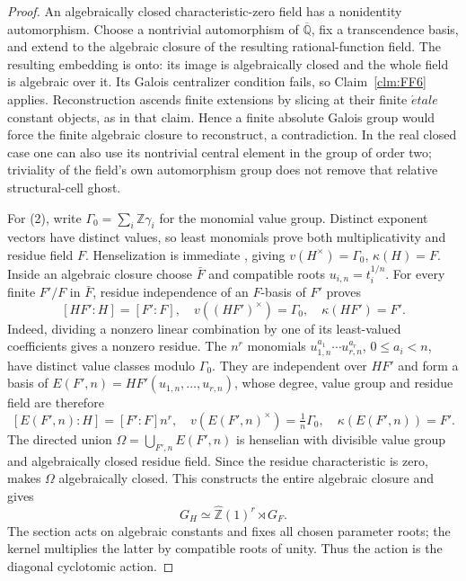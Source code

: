 \begin{proof}
An algebraically closed characteristic-zero field has a
nonidentity automorphism. Choose a nontrivial automorphism
of \(\overline{\mathbb Q}\), fix a transcendence basis,
and extend to the algebraic closure of the resulting
rational-function field. The resulting embedding is onto:
its image is algebraically closed and the whole field is
algebraic over it. Its Galois centralizer condition fails,
so Claim~\ref{clm:FF6} applies. Reconstruction ascends
finite extensions by slicing at their finite \(\acute etale\)
constant objects, as in that claim. Hence a finite absolute
Galois group would force the finite algebraic closure to
reconstruct, a contradiction. In the real closed case one
can also use its nontrivial central element in the group
of order two; triviality of the field's own automorphism
group does not remove that relative structural-cell ghost.

For (2), write \(\Gamma_0=\sum_i\mathbb Z\gamma_i\)
for the monomial value group. Distinct exponent vectors
have distinct values, so least monomials prove both
multiplicativity and residue field \(F\). Henselization
is immediate \citep[Corollary~3.3.26]{FF_ADH2017}, giving
\(v(H^\times)=\Gamma_0\), \(\kappa(H)=F\).
Inside an algebraic closure choose \(\bar F\) and
compatible roots \(u_{i,n}=t_i^{1/n}\). For every finite
\(F'/F\) in \(\bar F\), residue independence of an
\(F\)-basis of \(F'\) proves
\[
 [HF':H]=[F':F],\quad
 v((HF')^\times)=\Gamma_0,\quad \kappa(HF')=F'.
\]
Indeed, dividing a nonzero linear combination by one of
its least-valued coefficients gives a nonzero residue.
The \(n^r\) monomials
\(u_{1,n}^{a_1}\cdots u_{r,n}^{a_r}\),
\(0\le a_i<n\), have distinct value classes modulo
\(\Gamma_0\). They are independent over \(HF'\) and
form a basis of
\(E(F',n)=HF'(u_{1,n},\ldots,u_{r,n})\), whose degree,
value group and residue field are therefore
\[
 [E(F',n):H]=[F':F]n^r,\quad
 v(E(F',n)^\times)=\tfrac1n\Gamma_0,\quad
 \kappa(E(F',n))=F'.
\]
The directed union \(\Omega=\bigcup_{F',n}E(F',n)\)
is henselian with divisible value group and algebraically
closed residue field. Since the residue characteristic
is zero, \citet[Corollary~3.3.22]{FF_ADH2017} makes
\(\Omega\) algebraically closed. This constructs the
entire algebraic closure and gives
\[
 G_H\simeq\widehat{\mathbb Z}(1)^r\rtimes G_F.
                                                        \tag{FF.22.1}
\]
The section acts on algebraic constants and fixes all
chosen parameter roots; the kernel multiplies the latter
by compatible roots of unity. Thus the action is the
diagonal cyclotomic action.


\end{proof}
